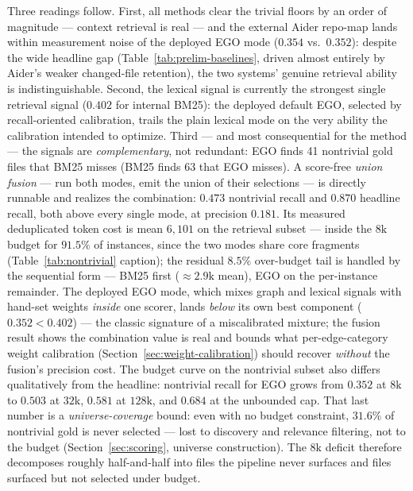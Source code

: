 \documentclass[11pt, a4paper]{article}
\begin{document}
Three readings follow. First, all methods clear the trivial floors by an order of magnitude --- context retrieval is real --- and the external Aider repo-map lands within measurement noise of the deployed EGO mode ($0.354$ vs.\ $0.352$): despite the wide headline gap (Table~\ref{tab:prelim-baselines}, driven almost entirely by Aider's weaker changed-file retention), the two systems' genuine retrieval ability is indistinguishable. Second, the lexical signal is currently the strongest single retrieval signal ($0.402$ for internal BM25): the deployed default EGO, selected by recall-oriented calibration, trails the plain lexical mode on the very ability the calibration intended to optimize. Third --- and most consequential for the method --- the signals are \emph{complementary}, not redundant: EGO finds 41 nontrivial gold files that BM25 misses (BM25 finds 63 that EGO misses). A score-free \emph{union fusion} --- run both modes, emit the union of their selections --- is directly runnable and realizes the combination: $0.473$ nontrivial recall and $0.870$ headline recall, both above every single mode, at precision $0.181$. Its measured deduplicated token cost is mean $6{,}101$ on the retrieval subset --- inside the $8\mathrm{k}$ budget for $91.5\%$ of instances, since the two modes share core fragments (Table~\ref{tab:nontrivial} caption); the residual $8.5\%$ over-budget tail is handled by the sequential form --- BM25 first ($\approx 2.9\mathrm{k}$ mean), EGO on the per-instance remainder. The deployed EGO mode, which mixes graph and lexical signals with hand-set weights \emph{inside} one scorer, lands \emph{below} its own best component ($0.352 < 0.402$) --- the classic signature of a miscalibrated mixture; the fusion result shows the combination value is real and bounds what per-edge-category weight calibration (Section~\ref{sec:weight-calibration}) should recover \emph{without} the fusion's precision cost. The budget curve on the nontrivial subset also differs qualitatively from the headline: nontrivial recall for EGO grows from $0.352$ at $8\mathrm{k}$ to $0.503$ at $32\mathrm{k}$, $0.581$ at $128\mathrm{k}$, and $0.684$ at the unbounded cap. That last number is a \emph{universe-coverage} bound: even with no budget constraint, $31.6\%$ of nontrivial gold is never selected --- lost to discovery and relevance filtering, not to the budget (Section~\ref{sec:scoring}, universe construction). The $8\mathrm{k}$ deficit therefore decomposes roughly half-and-half into files the pipeline never surfaces and files surfaced but not selected under budget.
\end{document}
